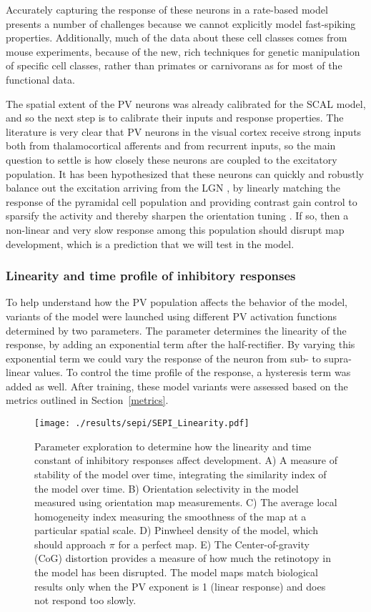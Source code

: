 Accurately capturing the response of these neurons in a rate-based
model presents a number of challenges because we cannot explicitly
model fast-spiking properties. Additionally, much of the data about
these cell classes comes from mouse experiments, because of the new,
rich techniques for genetic manipulation of specific cell classes,
rather than primates or carnivorans as for most of the functional
data.

The spatial extent of the PV neurons was already calibrated for the
SCAL model, and so the next step is to calibrate their inputs and
response properties. The literature is very clear that PV neurons in
the visual cortex receive strong inputs both from thalamocortical
afferents and from recurrent inputs, so the main question to settle is
how closely these neurons are coupled to the excitatory population. It
has been hypothesized that these neurons can quickly and robustly
balance out the excitation arriving from the LGN \citep{Swadlow2003,
  Burkhalter2008}, by linearly matching the response of the pyramidal
cell population and providing contrast gain control to sparsify the
activity and thereby sharpen the orientation tuning
\citep{Wilson2012}.  If so, then a non-linear and very slow response
among this population should disrupt map development, which is a
prediction that we will test in the model.

\subsubsection{Linearity and time profile of inhibitory responses}

To help understand how the PV population affects the behavior of the
model, variants of the model were launched using different PV
activation functions determined by two parameters. The parameter
determines the linearity of the response, by adding an exponential
term after the half-rectifier. By varying this exponential term we
could vary the response of the neuron from sub- to supra-linear
values. To control the time profile of the response, a hysteresis term
was added as well. After training, these model variants were assessed
based on the metrics outlined in Section~\ref{metrics}.

\begin{figure}
	\centering
        \texttt{[image: ./results/sepi/SEPI\_Linearity.pdf]}
	\caption{Parameter exploration to determine how the linearity and
      time constant of inhibitory responses affect development. A) A
      measure of stability of the model over time, integrating the
      similarity index of the model over time. B) Orientation
      selectivity in the model measured using orientation map
      measurements. C) The average local homogeneity index measuring
      the smoothness of the map at a particular spatial scale. D)
      Pinwheel density of the model, which should approach $\pi$ for a
      perfect map. E) The Center-of-gravity (CoG) distortion provides
      a measure of how much the retinotopy in the model has been
      disrupted.  The model maps match biological results only when
      the PV exponent is 1 (linear response) and does not respond too
      slowly.}
	\label{SEPILinearity}
\end{figure}

